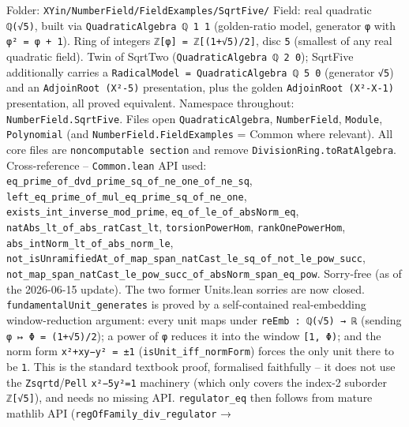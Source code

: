 \documentclass[UTF8,a4paper,11pt,fontset=fandol]{ctexart}
\theoremstyle{definition}
\begin{document}
Folder: \texttt{XYin/\allowbreak{}NumberField/\allowbreak{}FieldExamples/\allowbreak{}SqrtFive/\allowbreak{}} Field: real quadratic \texttt{ℚ(√5)}, built via \texttt{QuadraticAlgebra ℚ 1 1} (golden-ratio model, generator \texttt{φ} with \texttt{φ² = φ + 1}). Ring of integers \texttt{ℤ[φ] = ℤ[(1+√5)/\allowbreak{}2]}, disc \texttt{5} (smallest of any real quadratic field). Twin of SqrtTwo (\texttt{QuadraticAlgebra ℚ 2 0}); SqrtFive additionally carries a \texttt{RadicalModel = QuadraticAlgebra ℚ 5 0} (generator \texttt{√5}) and an \texttt{AdjoinRoot (X²-5)} presentation, plus the golden \texttt{AdjoinRoot (X²-X-1)} presentation, all proved equivalent. Namespace throughout: \texttt{NumberField.\allowbreak{}SqrtFive}. Files open \texttt{QuadraticAlgebra}, \texttt{NumberField}, \texttt{Module}, \texttt{Polynomial} (and \texttt{NumberField.\allowbreak{}FieldExamples} = Common where relevant). All core files are \texttt{noncomputable section} and remove \texttt{DivisionRing.\allowbreak{}toRatAlgebra}. Cross-reference -- \texttt{Common.\allowbreak{}lean} API used: \texttt{eq\_\allowbreak{}prime\_\allowbreak{}of\_\allowbreak{}dvd\_\allowbreak{}prime\_\allowbreak{}sq\_\allowbreak{}of\_\allowbreak{}ne\_\allowbreak{}one\_\allowbreak{}of\_\allowbreak{}ne\_\allowbreak{}sq}, \texttt{left\_\allowbreak{}eq\_\allowbreak{}prime\_\allowbreak{}of\_\allowbreak{}mul\_\allowbreak{}eq\_\allowbreak{}prime\_\allowbreak{}sq\_\allowbreak{}of\_\allowbreak{}ne\_\allowbreak{}one}, \texttt{exists\_\allowbreak{}int\_\allowbreak{}inverse\_\allowbreak{}mod\_\allowbreak{}prime}, \texttt{eq\_\allowbreak{}of\_\allowbreak{}le\_\allowbreak{}of\_\allowbreak{}absNorm\_\allowbreak{}eq}, \texttt{natAbs\_\allowbreak{}lt\_\allowbreak{}of\_\allowbreak{}abs\_\allowbreak{}ratCast\_\allowbreak{}lt}, \texttt{torsionPowerHom}, \texttt{rankOnePowerHom}, \texttt{abs\_\allowbreak{}intNorm\_\allowbreak{}lt\_\allowbreak{}of\_\allowbreak{}abs\_\allowbreak{}norm\_\allowbreak{}le}, \texttt{not\_\allowbreak{}isUnramifiedAt\_\allowbreak{}of\_\allowbreak{}map\_\allowbreak{}span\_\allowbreak{}natCast\_\allowbreak{}le\_\allowbreak{}sq\_\allowbreak{}of\_\allowbreak{}not\_\allowbreak{}le\_\allowbreak{}pow\_\allowbreak{}succ}, \texttt{not\_\allowbreak{}map\_\allowbreak{}span\_\allowbreak{}natCast\_\allowbreak{}le\_\allowbreak{}pow\_\allowbreak{}succ\_\allowbreak{}of\_\allowbreak{}absNorm\_\allowbreak{}span\_\allowbreak{}eq\_\allowbreak{}pow}. Sorry-free (as of the 2026-06-15 update). The two former Units.lean sorries are now closed. \texttt{fundamentalUnit\_\allowbreak{}generates} is proved by a self-contained real-embedding window-reduction argument: every unit maps under \texttt{reEmb : ℚ(√5) → ℝ} (sending \texttt{φ ↦ Φ = (1+√5)/\allowbreak{}2}); a power of \texttt{φ} reduces it into the window \texttt{[1, Φ)}; and the norm form \texttt{x²+xy−y² = ±1} (\texttt{isUnit\_\allowbreak{}iff\_\allowbreak{}normForm}) forces the only unit there to be \texttt{1}. This is the standard textbook proof, formalised faithfully -- it does not use the \texttt{Zsqrtd}/\texttt{Pell} \texttt{x²−5y²=1} machinery (which only covers the index-2 suborder \texttt{ℤ[√5]}), and needs no missing API. \texttt{regulator\_\allowbreak{}eq} then follows from mature mathlib API (\texttt{regOfFamily\_\allowbreak{}div\_\allowbreak{}regulator} → 
\end{document}
